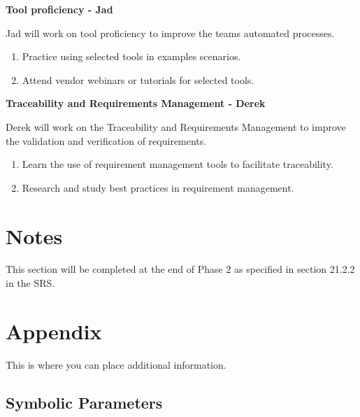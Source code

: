 \documentclass[12pt, titlepage]{article}
\begin{document}
\begin{enumerate}
          \textbf{Tool proficiency - Jad}

          Jad will work on tool proficiency to improve the teams automated processes.
          \begin{enumerate}
              \item Practice using selected tools in examples scenarios.
              \item Attend vendor webinars or tutorials for selected tools.
          \end{enumerate}

          \textbf{Traceability and Requirements Management - Derek}

          Derek will work on the Traceability and Requirements Management to improve the
          validation and verification of requirements.
          \begin{enumerate}
              \item Learn the use of requirement management tools to facilitate traceability.
              \item Research and study best practices in requirement management.
          \end{enumerate}

\end{enumerate}


\section*{Notes}
This section will be completed at the end of Phase 2 as specified in section 21.2.2 in the SRS.

\section{Appendix}

This is where you can place additional information.

\subsection{Symbolic Parameters}
\end{document}
